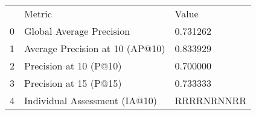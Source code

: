\begin{tabular}{lll}
 & Metric & Value \\
0 & Global Average Precision & 0.731262 \\
1 & Average Precision at 10 (AP@10) & 0.833929 \\
2 & Precision at 10 (P@10) & 0.700000 \\
3 & Precision at 15 (P@15) & 0.733333 \\
4 & Individual Assessment (IA@10) & RRRRNRNNRR \\
\end{tabular}
